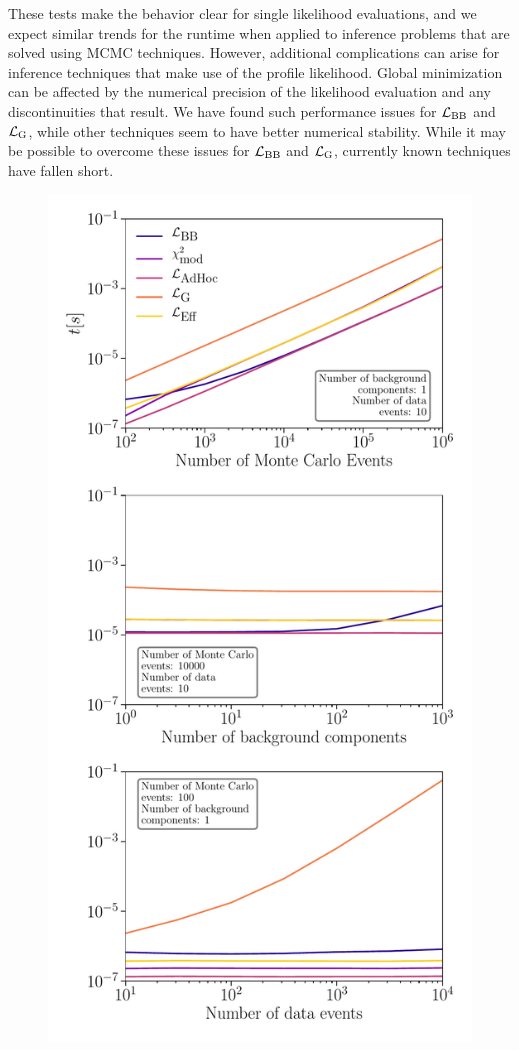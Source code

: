 These tests make the behavior clear for single likelihood evaluations, and we expect similar trends for the runtime when applied to inference problems that are solved using MCMC techniques.
However, additional complications can arise for inference techniques that make use of the profile likelihood.
Global minimization can be affected by the numerical precision of the likelihood evaluation and any discontinuities that result.
We have found such performance issues for $\mathcal{L}_{\textmd{BB}}$ and $\mathcal{L}_\textmd{G}$, while other techniques seem to have better numerical stability.
While it may be possible to overcome these issues for $\mathcal{L}_{\textmd{BB}}$ and $\mathcal{L}_\textmd{G}$, currently known techniques have fallen short.

\begin{figure}[ht]
\centering
        \includegraphics[width=\textwidth,height=0.8\textheight,keepaspectratio]{fig/fig7_multi_panel}

\end{figure}
